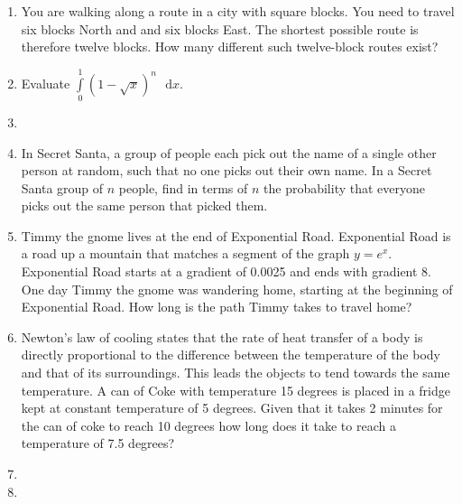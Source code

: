 \documentclass{article}
\begin{document}
\begin{enumerate}
    \item
    You are walking along a route in a city with square blocks. You need to travel six blocks North and and six blocks East. The shortest possible route is therefore twelve blocks. How many different such twelve-block routes exist?
    
    \item
    Evaluate $\int \limits_{0}^{1} (1-\sqrt{x})^n \text{ }\mathrm{d}x$.
    
    \item
    
    \item
    In Secret Santa, a group of people each pick out the name of a single other person at random, such that no one picks out their own name. In a Secret Santa group of $n$ people, find in terms of $n$ the probability that everyone picks out the same person that picked them.
            
    \item
    Timmy the gnome lives at the end of Exponential Road. Exponential Road is a road up a mountain that matches a segment of the graph $y = e^x$. Exponential Road starts at a gradient of 0.0025 and ends with gradient 8. One day Timmy the gnome was wandering home, starting at the beginning of Exponential Road. How long is the path Timmy takes to travel home?

    
    \item
    Newton's law of cooling states that the rate of heat transfer of a body is directly proportional to the difference between the temperature of the body and that of its surroundings. This leads the objects to tend towards the same temperature. A can of Coke with temperature 15 degrees is placed in a fridge kept at constant temperature of 5 degrees. Given that it takes 2 minutes for the can of coke to reach 10 degrees how long does it take to reach a temperature of 7.5 degrees?
    
    \item
    
    \item


    
    
    
    
    
    
\end{enumerate}
\end{document}

